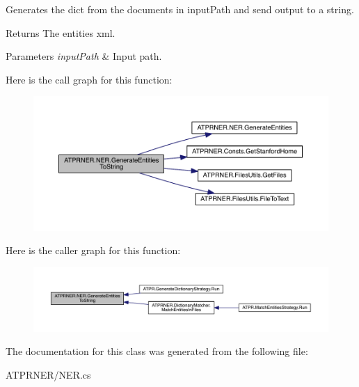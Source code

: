 Generates the dict from the documents in input\+Path and send output to a string. 

\begin{DoxyReturn}{Returns}
The entities xml.
\end{DoxyReturn}

\begin{DoxyParams}{Parameters}
{\em input\+Path} & Input path.\\
\hline
\end{DoxyParams}
Here is the call graph for this function\+:
\nopagebreak
\begin{figure}[H]
\begin{center}
\leavevmode
\includegraphics[width=350pt]{d5/dec/class_a_t_p_r_n_e_r_1_1_n_e_r_a8480137d05620d726021a2f4ae818869_cgraph}
\end{center}
\end{figure}
Here is the caller graph for this function\+:
\nopagebreak
\begin{figure}[H]
\begin{center}
\leavevmode
\includegraphics[width=350pt]{d5/dec/class_a_t_p_r_n_e_r_1_1_n_e_r_a8480137d05620d726021a2f4ae818869_icgraph}
\end{center}
\end{figure}


The documentation for this class was generated from the following file\+:\begin{DoxyCompactItemize}
\item 
A\+T\+P\+R\+N\+E\+R/N\+E\+R.\+cs\end{DoxyCompactItemize}
